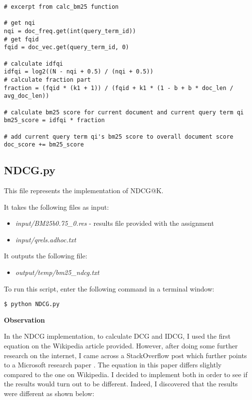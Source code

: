 \documentclass{article} %
\begin{document}
\begin{lstlisting}[style=Python]
# excerpt from calc_bm25 function

# get nqi
nqi = doc_freq.get(int(query_term_id))
# get fqid
fqid = doc_vec.get(query_term_id, 0)

# calculate idfqi
idfqi = log2((N - nqi + 0.5) / (nqi + 0.5))
# calculate fraction part
fraction = (fqid * (k1 + 1)) / (fqid + k1 * (1 - b + b * doc_len / avg_doc_len))

# calculate bm25 score for current document and current query term qi
bm25_score = idfqi * fraction

# add current query term qi's bm25 score to overall document score
doc_score += bm25_score

\end{lstlisting}

\subsection*{NDCG.py \cite{discountedcumulativegain}}

This file represents the implementation of NDCG@K.

It takes the following files as input:

\begin{itemize}
    \item \textit{input/BM25b0.75\_0.res} - results file provided with the assignment
    \item \textit{input/qrels.adhoc.txt}
\end{itemize}

It outputs the following file:

\begin{itemize}
    \item \textit{output/temp/bm25\_ndcg.txt}
\end{itemize}

To run this script, enter the following command in a terminal window:

\begin{lstlisting}[style=Bash]
  $ python NDCG.py
\end{lstlisting}

\textbf{Observation}

In the NDCG implementation, to calculate DCG and IDCG, I used the first equation on the Wikipedia \cite{discountedcumulativegain} article provided. However, after doing some further research on the internet, I came across a StackOverflow post \cite{stackoverflow} which further points to a Microsoft research paper \cite{sakai2014metrics}. The equation in this paper differs slightly compared to the one on Wikipedia. I decided to implement both in order to see if the results would turn out to be different. Indeed, I discovered that the results were different as shown below:
\end{document}
